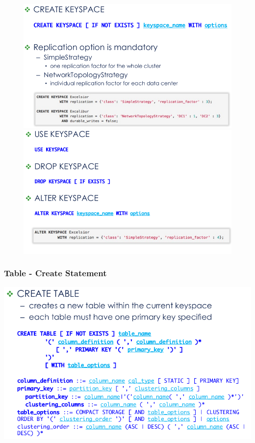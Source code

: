 \documentclass{article}
\begin{document}
\begin{figure}[!h]
  \centering
  \includegraphics[scale=0.25]{21}
  \includegraphics[scale=0.25]{22}
\end{figure}

\pagebreak

\subsubsection{Table - Create Statement}

\begin{center}
  \includegraphics[scale=0.25]{23}
\end{center}
\end{document}
